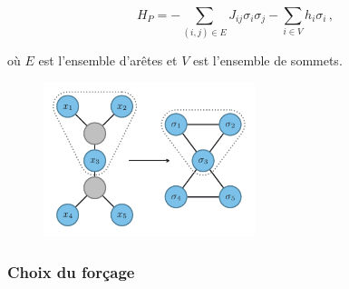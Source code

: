 \begin{equation}
    H_P = - \sum_{(i,j) \in E} J_{ij} \sigma_i \sigma_j - \sum_{i \in V} h_i \sigma_i \,,
\end{equation}

où $E$ est l'ensemble d'arêtes et $V$ est l'ensemble de sommets.

\begin{figure}[h]
    \centering
    \includegraphics[width=0.55\textwidth]{figures/ising-mapping}
    \caption[Transformation du problème \#NAE3SAT et \#1-in-3SAT au modèle d'Ising]{}
    \label{fig:transformation-ising}
\end{figure}



\subsubsection{Choix du forçage}

